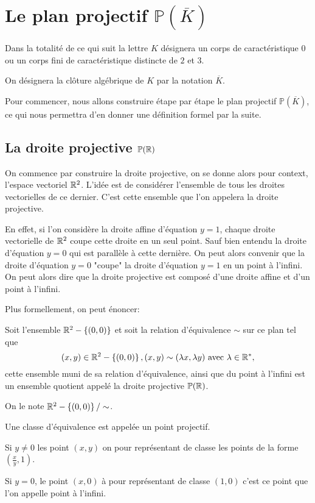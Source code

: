 \chapter{Le plan projectif $\mathbb{P}(\overline{K})$}

Dans la totalité de ce qui suit la lettre $K$ désignera un corps de caractéristique $0$ ou un corps fini de caractéristique distincte de $2$ et $3$.

On désignera la clôture algébrique de $K$ par la notation $\overline{K}$.

Pour commencer, nous allons construire étape par étape le plan projectif $\mathbb{P}(\overline{K})$, ce qui nous permettra d'en donner une définition formel par la suite.

\section{La droite projective $\mathbb{P}(\mathbb{R})$}
On commence par construire la droite projective, on se donne alors pour context, l'espace vectoriel $\mathbb{R}^2$. L'idée est de considérer l'ensemble de tous les droites vectorielles de ce dernier. C'est cette ensemble que l'on appelera la droite projective.

En effet, si l'on considère la droite affine d'équation $y=1$, chaque droite vectorielle de $\mathbb{R}^2$ coupe cette droite en un seul point. Sauf bien entendu la droite d'équation $y=0$ qui est parallèle à cette dernière. On peut alors convenir que la droite d'équation $y=0$ "coupe" la droite d'équation $y=1$ en un point à l'infini. On peut alors dire que la droite projective est composé d'une droite affine et d'un point à l'infini.

Plus formellement, on peut énoncer:

\begin{definition}
    Soit l'ensemble $\mathbb{R}^2-\left\{ (0,0) \right\} $ et soit la relation d'équivalence $ \sim$ sur ce plan tel que
    \[
        (x,y) \in\mathbb{R}^2- \left\{ (0,0) \right\} , (x,y) \sim (\lambda x, \lambda y) \text{ avec } \lambda \in \mathbb{R}^{*}
    ,\] 
    cette ensemble muni de sa relation d'équivalence, ainsi que du point à l'infini est un ensemble quotient appelé la droite projective $\mathbb{P}(\mathbb{R})$.

    On le note $\mathbb{R}^2-\left\{ (0,0) \right\} / \sim$.

    Une classe d'équivalence est appelée un point projectif.
\end{definition}

\begin{remarque}
    Si $y\neq 0$ les point $(x,y)$ on pour représentant de classe les points de la forme $(\frac{x}{y},1)$.

    Si $y=0$, le point $(x,0)$ à pour représentant de classe $(1,0)$ c'est ce point que l'on appelle point à l'infini.
\end{remarque}

